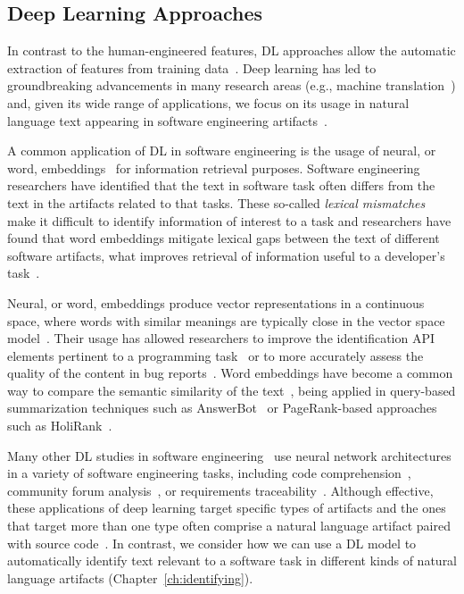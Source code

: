 \subsection{Deep Learning Approaches}
\label{cp2:deep-learning}





In contrast to the human-engineered features,
\acf{DL} approaches allow the automatic extraction of features 
from training data~\cite{Deng2018, zhang2021deep}.
Deep learning has led to groundbreaking advancements in many 
research areas (e.g., machine translation~\cite{lopez2008translation}) 
and, given its wide range of applications, 
we focus
on its usage in natural language text appearing in software engineering artifacts~\cite{ferreira2021, li2018deep, watson2022}.






A common application of \acs{DL} in software engineering is the usage of neural, or word, embeddings~\cite{Mikolov2013}
for information retrieval purposes. 
Software engineering researchers have identified that the text 
in software task 
often differs from the text in the artifacts related to that tasks. 
These so-called \textit{lexical mismatches}~\cite{Ye2016, Huang2018} 
 make it difficult to identify information of interest 
to a task and researchers have found that word
embeddings mitigate lexical gaps between the text of different software artifacts,
what improves retrieval of information useful to a developer's task~\cite{Ye2016}. 


Neural, or word, embeddings produce vector representations in a continuous space,
where words with similar meanings are typically close in the vector space model~\cite{harris1954distributional, mikolov2013efficient}. 
Their usage has allowed researchers to improve 
the identification API elements pertinent to a programming task~\cite{Ye2016} 
or to more accurately assess the quality of the content in bug reports~\cite{chaparro2019}.
Word embeddings have become a common way 
to compare the semantic similarity of the text~\cite{mihalcea2006},
being applied in query-based summarization techniques such as 
AnswerBot~\cite{Xu2017}
or PageRank-based approaches such as HoliRank~\cite{Ponzanelli2017}.



Many other \acs{DL} studies in software engineering~\cite{ferreira2021,li2018deep, watson2022}
use neural network architectures 
in a variety of software engineering tasks, including
code comprehension~\cite{allamanis2015, mi2018}, 
community forum analysis~\cite{Lin2018, wang2019}, 
or requirements traceability~\cite{chen2019, guo2017}.
Although effective, these applications of deep learning
target specific
types of artifacts and the ones 
that target more than one type 
often comprise a natural language artifact 
paired with source code~\cite{watson2022}. 
In contrast, 
we consider how we can use a \acs{DL}
model to automatically 
identify text relevant to a software task
in different kinds of natural language artifacts (Chapter~\ref{ch:identifying}).


